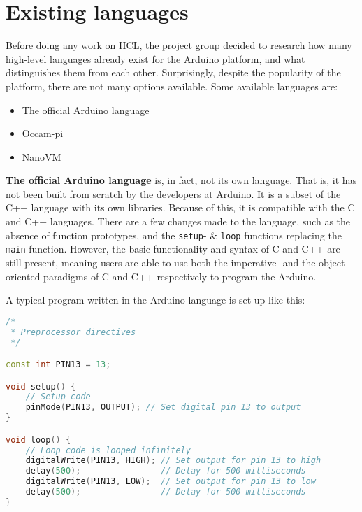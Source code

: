 \section{Existing languages}
Before doing any work on HCL, the project group decided to research how many high-level languages already exist for the Arduino platform, and what distinguishes them from each other.
Surprisingly, despite the popularity of the platform, there are not many options available.
Some available languages are:

\begin{itemize}
	\item The official Arduino language
	\item Occam-pi
	\item NanoVM
\end{itemize}

\textbf{The official Arduino language} is, in fact, not its own language. %
That is, it has not been built from scratch by the developers at Arduino.
It is a subset of the C++ language with its own libraries.
Because of this, it is compatible with the C and C++ languages.
There are a few changes made to the language, such as the absence of function prototypes, and the \texttt{setup}- \& \texttt{loop} functions replacing the \texttt{main} function.
However, the basic functionality and syntax of C and C++ are still present, meaning users are able to use both the imperative- and the object-oriented paradigms of C and C++ respectively to program the Arduino.

A typical program written in the Arduino language is set up like this:

\begin{lstlisting}[language=C++,label=lis:arduinoExample,caption=An example program written in the Arduino language.,firstnumber=1]
/*
 * Preprocessor directives
 */

const int PIN13 = 13;

void setup() {
    // Setup code
    pinMode(PIN13, OUTPUT); // Set digital pin 13 to output
}

void loop() {
    // Loop code is looped infinitely
    digitalWrite(PIN13, HIGH); // Set output for pin 13 to high
    delay(500);                // Delay for 500 milliseconds
    digitalWrite(PIN13, LOW);  // Set output for pin 13 to low
    delay(500);                // Delay for 500 milliseconds
}

\end{lstlisting}

